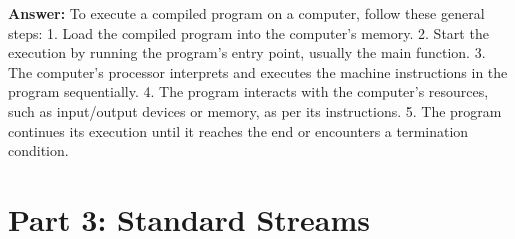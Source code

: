 \documentclass{article}
\begin{document}
\begin{enumerate}
    \textbf{Answer:}
    To execute a compiled program on a computer, follow these general steps:
    1. Load the compiled program into the computer's memory.
    2. Start the execution by running the program's entry point, usually the main function.
    3. The computer's processor interprets and executes the machine instructions in the program sequentially.
    4. The program interacts with the computer's resources, such as input/output devices or memory, as per its instructions.
    5. The program continues its execution until it reaches the end or encounters a termination condition.
    
\end{enumerate}

\section*{Part 3: Standard Streams}
\end{document}
